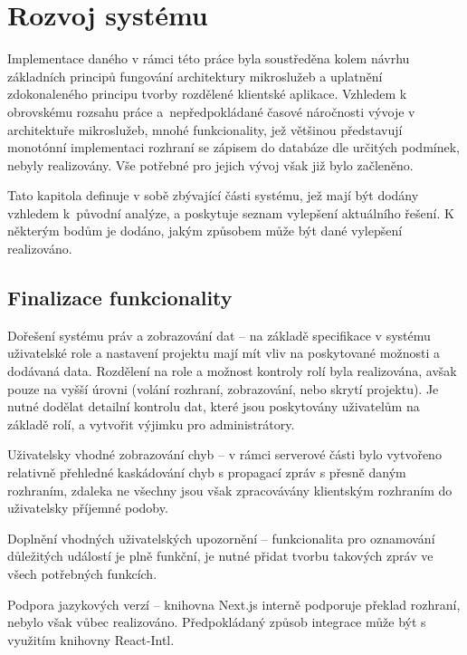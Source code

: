 \chapter{Rozvoj systému}\label{ch:improvements}


Implementace daného  v rámci této práce byla soustředěna kolem návrhu základních principů fungování architektury mikroslužeb a uplatnění zdokonaleného principu tvorby rozdělené klientské aplikace.
Vzhledem k obrovskému rozsahu práce a~nepředpokládané časové náročnosti vývoje v architektuře mikroslužeb, mnohé funkcionality, jež většinou představují monotónní implementaci  rozhraní se zápisem do databáze dle určitých podmínek, nebyly realizovány.
Vše potřebné pro jejich vývoj však již bylo začleněno.

Tato kapitola definuje v sobě zbývající části systému, jež mají být dodány vzhledem k~původní analýze, a poskytuje seznam vylepšení aktuálního řešení.
K některým bodům je dodáno, jakým způsobem může být dané vylepšení realizováno.

\newpage



\section{Finalizace funkcionality}\label{sec:unimplemented}

\begin{dl}
   \item[Dořešení systému práv a zobrazování dat] – na základě specifikace v systému uživatelské role a nastavení projektu mají mít vliv na poskytované možnosti a dodávaná data.
   Rozdělení na role a možnost kontroly rolí byla realizována, avšak pouze na vyšší úrovni (volání rozhraní, zobrazování, nebo skrytí projektu).
   Je nutné dodělat detailní kontrolu dat, které jsou poskytovány uživatelům na základě rolí, a vytvořit výjimku pro administrátory.
   \item[Uživatelsky vhodné zobrazování chyb] – v rámci serverové části bylo vytvořeno relativně přehledné kaskádování chyb s propagací zpráv s přesně daným rozhraním, zdaleka ne všechny jsou však zpracovávány klientským rozhraním do uživatelsky příjemné podoby.
   \item[Doplnění vhodných uživatelských upozornění] – funkcionalita pro oznamování důležitých událostí je plně funkční, je nutné přidat tvorbu takových zpráv ve všech potřebných funkcích.
   \item[Podpora jazykových verzí] – knihovna Next.js interně podporuje překlad rozhraní, nebylo však vůbec realizováno.
   Předpokládaný způsob integrace může být s využitím knihovny React-Intl.
\end{dl}

